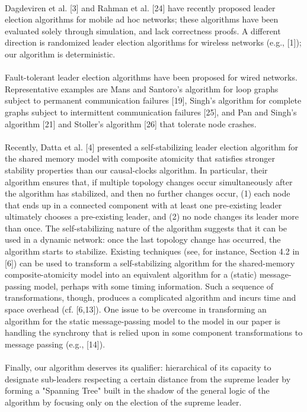 \paragraph{}Dagdeviren et al. [3] and Rahman et al. [24] have recently proposed leader election algorithms for mobile ad hoc networks; these algorithms have been evaluated solely through simulation, and lack correctness proofs. A different direction is randomized leader election algorithms for wireless networks (e.g., [1]); our algorithm is deterministic.
\paragraph{}Fault-tolerant leader election algorithms have been proposed for wired networks. Representative examples are Mans and Santoro’s algorithm for loop graphs subject to permanent communication failures [19], Singh’s algorithm for complete graphs subject to intermittent communication failures [25], and Pan and Singh’s algorithm [21] and Stoller’s algorithm [26] that tolerate node crashes.
\paragraph{}Recently, Datta et al. [4] presented a self-stabilizing leader election algorithm for the shared memory model with composite atomicity that satisfies stronger stability properties than our causal-clocks algorithm. In particular, their algorithm ensures that, if multiple topology changes occur simultaneously after the algorithm has stabilized, and then no further changes occur, (1) each node that ends up in a connected component with at least one pre-existing leader ultimately chooses a pre-existing leader, and (2) no node changes its leader more than once. The self-stabilizing nature of the algorithm suggests that it can be used in a dynamic network: once the last topology change has occurred, the algorithm starts to stabilize. Existing techniques (see, for instance, Section 4.2 in [6]) can be used to transform a self-stabilizing algorithm for the shared-memory composite-atomicity model into an equivalent algorithm for a (static) message-passing model, perhaps with some timing information. Such a sequence of transformations, though, produces a complicated algorithm and incurs time and space overhead (cf. [6,13]). One issue to be overcome in transforming an algorithm for the static message-passing model to the model in our paper is handling the synchrony that is relied upon in some component transformations to message passing (e.g., [14]).
\paragraph{}Finally, our algorithm deserves its qualifier: hierarchical of its capacity to designate sub-leaders respecting a certain distance from the supreme leader by forming a "Spanning Tree" built in the shadow of the general logic of the algorithm by focusing only on the election of the supreme leader.
\paragraph{}